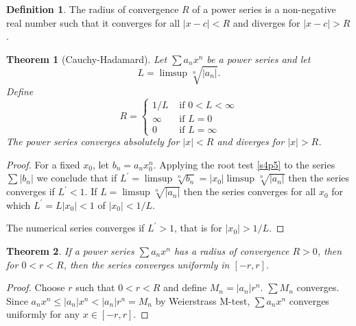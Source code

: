 \documentclass{article}
\theoremstyle{plain}
\newtheorem{thm}{Theorem}
\numberwithin{thm}{section}
\theoremstyle{plain}
\numberwithin{prop}{section}
\theoremstyle{definition}
\newtheorem{defn}{Definition}
\numberwithin{defn}{section}
\theoremstyle{remark}
\numberwithin{equation}{section}
\newcommand{\op}{\prime}
\begin{document}
\begin{defn}\label{s6d2}
The radius of convergence $R$ of a power series is a non-negative real number
such that it converges for all $|x - c| < R$ and diverges for $|x - c| > R$.
\end{defn}

\begin{thm}[Cauchy-Hadamard]\label{s6t1}
Let $\sum a_nx^n$ be a power series and let 
\[
L = \limsup \sqrt[n]{|a_n|}.
\]
Define 
\[
R = \begin{cases}
1/L & \text{ if } 0 < L < \infty \\
\infty & \text{ if } L = 0 \\
0 & \text{ if } L = \infty
\end{cases}
\]
The power series converges absolutely for $|x| < R$ and diverges for $|x| > R$.
\end{thm}
\begin{proof}
For a fixed $x_0$, let $b_n = a_n x_0^n$. Applying the root test \ref{s4p5}
to the series $\sum |b_n|$ we conclude that if $L^\op = \limsup\sqrt[n]{b_n}
= |x_0|\limsup\sqrt[n]{|a_n|}$ then the series converges if $L^\op < 1$. If
$L = \limsup\sqrt[n]{|a_n|}$ then the series converges for all $x_0$ for which
$L^\op = L|x_0| < 1$ of $|x_0| < 1/L$. 

The numerical series converges if $L^\op > 1$, that is for $|x_0| > 1/L$.
\end{proof}

\begin{thm}\label{s6t2}
If a power series $\sum a_nx^n$ has a radius of convergence $R > 0$, then for
$0 < r < R$, then the series converges uniformly in $[-r, r]$.
\end{thm}
\begin{proof}
Choose $r$ such that $0 < r < R$ and define $M_n = |a_n|r^n$. $\sum M_n$ 
converges. Since $a_nx^n \le |a_n|x^n < |a_n|r^n = M_n$ by Weierstrass M-test, 
$\sum a_nx^n$ converges uniformly for any $x \in [-r, r]$.
\end{proof}
\end{document}
